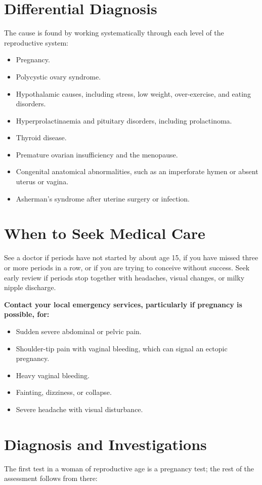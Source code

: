 \section*{Differential Diagnosis}
The cause is found by working systematically through each level of the reproductive system:

\begin{itemize}
    \item Pregnancy.
    \item Polycystic ovary syndrome.
    \item Hypothalamic causes, including stress, low weight, over-exercise, and eating disorders.
    \item Hyperprolactinaemia and pituitary disorders, including prolactinoma.
    \item Thyroid disease.
    \item Premature ovarian insufficiency and the menopause.
    \item Congenital anatomical abnormalities, such as an imperforate hymen or absent uterus or vagina.
    \item Asherman's syndrome after uterine surgery or infection.
\end{itemize}

\section*{When to Seek Medical Care}
See a doctor if periods have not started by about age 15, if you have missed three or more periods in a row, or if you are trying to conceive without success. Seek early review if periods stop together with headaches, visual changes, or milky nipple discharge.

\textbf{Contact your local emergency services, particularly if pregnancy is possible, for:}
\begin{itemize}
    \item Sudden severe abdominal or pelvic pain.
    \item Shoulder-tip pain with vaginal bleeding, which can signal an ectopic pregnancy.
    \item Heavy vaginal bleeding.
    \item Fainting, dizziness, or collapse.
    \item Severe headache with visual disturbance.
\end{itemize}

\section*{Diagnosis and Investigations}
The first test in a woman of reproductive age is a pregnancy test; the rest of the assessment follows from there:

